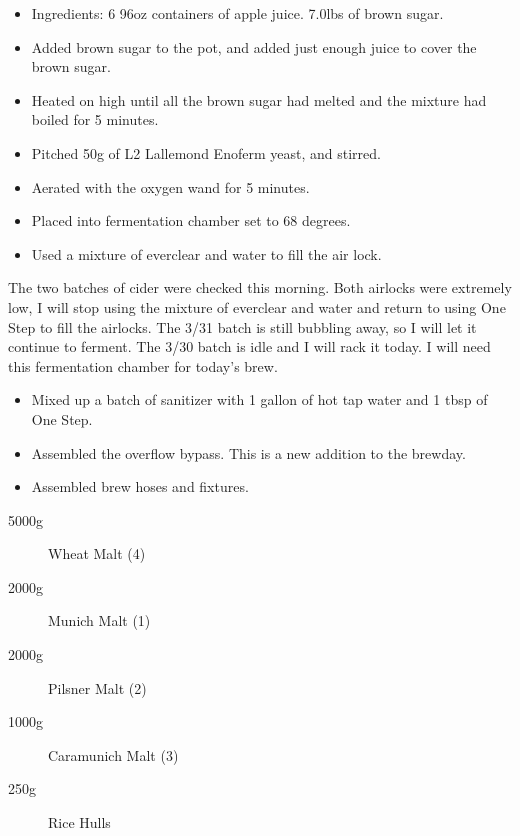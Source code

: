\def\todaysdate{20200331}
\newday{\todaysdate}\label{\todaysdate}

\begin{itemize}
    \item Ingredients: 6 96oz containers of apple juice. 7.0lbs of brown sugar.
    \item Added brown sugar to the pot, and added just enough juice to cover the brown sugar.
    \item Heated on high until all the brown sugar had melted and the mixture had boiled for 5 minutes.
    \item Pitched 50g of L2 Lallemond Enoferm yeast, and stirred.
    \item Aerated with the oxygen wand for 5 minutes.
    \item Placed into fermentation chamber set to 68 degrees.
    \item Used a mixture of everclear and water to fill the air lock.
\end{itemize}

\def\todaysdate{20200430}
\newday{\todaysdate}\label{\todaysdate}


The two batches of cider were checked this morning.  Both airlocks were extremely low, I will stop using the mixture of everclear and water and return to using One Step to fill the airlocks.  The 3/31 batch is still bubbling away, so I will let it continue to ferment.  The 3/30 batch is idle and I will rack it today.  I will need this fermentation chamber for today's brew.

\begin{itemize}
    \item Mixed up a batch of sanitizer with 1 gallon of hot tap water and 1 tbsp of One Step.
    \item Assembled the overflow bypass.  This is a new addition to the brewday.
    \item Assembled brew hoses and fixtures. 
\end{itemize}

\begin{description}
    \item[5000g] Wheat Malt (4)
    \item[2000g] Munich Malt (1)
    \item[2000g] Pilsner Malt (2)
    \item[1000g] Caramunich Malt (3)
    \item[250g] Rice Hulls
\end{description}

